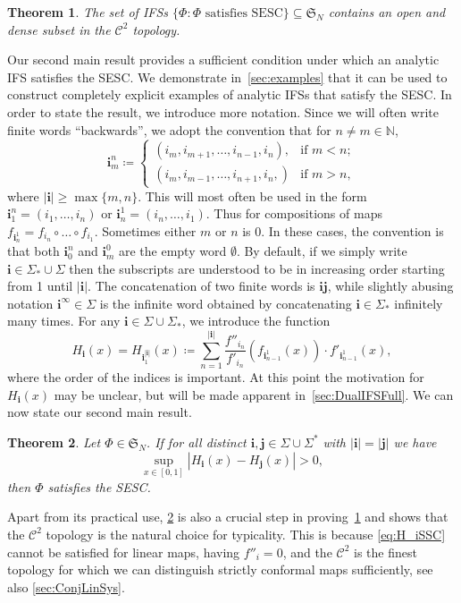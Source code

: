 \documentclass[11pt,]{article}
\def\cref#1{\ref{#1}}%
\newtheorem{theorem}{Theorem}[section]
\theoremstyle{definition}
\theoremstyle{remark}
\newcommand{\0}{\mathbf{0}}
\newcommand{\bi}{\mathbf{i}}
\newcommand{\bj}{\mathbf{j}}
\begin{document}
\begin{theorem}\label{thm:ESCOpenDense}
  The set of IFSs $\{\Phi \colon \Phi\text{ satisfies SESC}\}\subseteq \mathfrak{S}_N$ contains an open and
  dense subset in the $\mathcal{C}^2$ topology.
\end{theorem}
Our second main result provides a sufficient condition under which an analytic IFS satisfies the
SESC. We demonstrate in~\cref{sec:examples} that it can be used to construct completely explicit
examples of analytic IFSs that satisfy the SESC. In order to state the result, we introduce more
notation. Since we will often write finite words ``backwards'', we adopt the convention that for
$n\neq m\in\mathbb{N}$,
\begin{equation*}
	\bi_m^n\coloneqq
	\begin{cases}
		(i_m,i_{m+1},\ldots,i_{n-1},i_n), &\text{if } m<n; \\
		(i_m,i_{m-1},\ldots,i_{n+1},i_n,) &\text{if } m>n,
	\end{cases}
\end{equation*}
where $|\bi|\geq\max\{m,n\}$. This will most often be used in the form $\bi_1^n=(i_1,\ldots,i_n)$ or
$\bi_n^1=(i_n,\ldots,i_1)$. Thus for compositions of maps $f_{\bi_n^1}=f_{i_n}\circ \dots \circ
f_{i_1}$. Sometimes either $m$ or $n$ is $0$. In these cases, the convention is that both $\bi_0^n$
and $\bi_m^0$ are the empty word $\emptyset$. By default, if we simply write
$\bi\in\Sigma_*\cup\Sigma$ then the subscripts are understood to be in increasing order starting
from 1 until $|\bi|$. The concatenation of two finite words is $\bi\bj$, while slightly abusing
notation $\bi^{\infty}\in \Sigma$ is the infinite word obtained by concatenating $\bi\in\Sigma_*$
infinitely many times. 
For any $\bi\in \Sigma\cup\Sigma_*$, we introduce the function 
\begin{equation}\label{eq:H_i(x)}
H_{\bi}(x)=H_{\bi_{1}^{|\bi|}}(x) \coloneqq \sum_{n=1}^{|\bi|}
\frac{f''_{i_n}}{f'_{i_n}}(f_{\bi_{n-1}^1}(x))\cdot f'_{\bi_{n-1}^1}(x),
\end{equation}
where the order of the indices is important. At this point the motivation for $H_{\bi}(x)$ may be unclear,
but will be made apparent in~\cref{sec:DualIFSFull}. 
We can now state our second main result.
\begin{theorem}
  \label{thm:main}
  Let $\Phi\in\mathfrak{S}_N$. If for all distinct $\bi,\bj \in\Sigma\cup\Sigma^*$ with $|\bi|=|\bj|$ we have
\begin{equation}\label{eq:H_iSSC}
    \sup_{x\in[0,1]} |H_{\bi}(x) - H_{\bj}(x)| > 0,
\end{equation}
then $\Phi$ satisfies the SESC.
\end{theorem}
Apart from its practical use, \cref{thm:main} is also a crucial step in
proving~\cref{thm:ESCOpenDense} and shows that the $\mathcal{C}^2$ topology
is the natural choice for typicality.
This is because \cref{eq:H_iSSC} cannot be satisfied for linear maps, having $f''_i =0$, and the
$\mathcal{C}^2$ is the finest topology for which we can distinguish strictly conformal maps
sufficiently, see also \cref{sec:ConjLinSys}.
\end{document}
